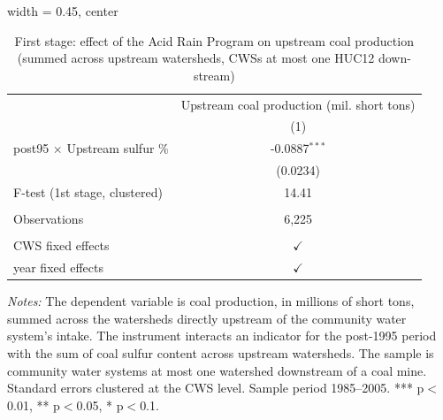 
\begin{table}[htbp]
   
   \caption{\label{tab:fs_dwnstrm_minevio_ivsumcoaltons} First stage: effect of the Acid Rain Program on upstream coal production (summed across upstream watersheds, CWSs at most one HUC12 down-stream)}
   \bigskip
   
   \centering
   
   \begin{adjustbox}{width = 0.45\textwidth, center}
      
      
      \begin{tabular}{lc}
         \toprule
         
                                              & Upstream coal production (mil. short tons)\\  
         
                                              & (1)\\  
         
         \midrule 
         post95 $\times$ Upstream sulfur \%   & -0.0887$^{***}$\\   
                                              & (0.0234)\\   
         
         F-test (1st stage, clustered)        & 14.41\\  
         
          \\
         
         Observations                         & 6,225\\  
         
          \\
         
         CWS fixed effects                    & $\checkmark$\\   
         year fixed effects                   & $\checkmark$\\   
         
         \bottomrule
         
      \end{tabular}
      
      
      
   \end{adjustbox}
      {\tiny\linespread{1}\selectfont \par \raggedright 
   \textit{Notes:} The dependent variable is coal production, in millions of short tons, summed across the watersheds directly upstream of the community water system's intake. The instrument interacts an indicator for the post-1995 period with the sum of coal sulfur content across upstream watersheds. The sample is community water systems at most one watershed downstream of a coal mine. Standard errors clustered at the CWS level. Sample period 1985--2005. *** p$<$0.01, ** p$<$0.05, * p$<$0.1.}
   
\end{table}


